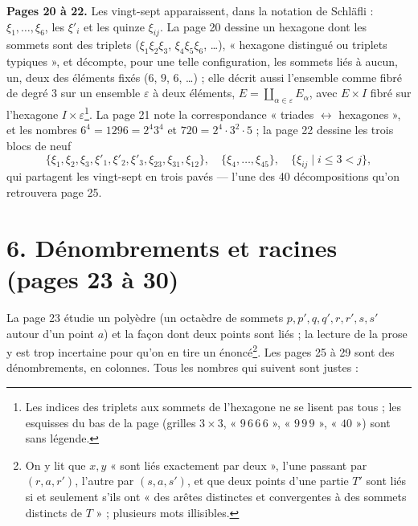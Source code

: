 \documentclass[11pt,a4paper]{article}
\begin{document}
\textbf{Pages 20 à 22.} Les vingt-sept apparaissent, dans la notation de
Schläfli : $\xi_1, \ldots, \xi_6$, les $\xi'_i$ et les quinze $\xi_{ij}$. La
page 20 dessine un hexagone dont les sommets sont des triplets ($\xi_1 \xi_2
\xi_3$, $\xi_4 \xi_5 \xi_6$, \ldots), « hexagone distingué ou triplets
typiques », et décompte, pour une telle configuration, les sommets liés à
aucun, un, deux des éléments fixés ($6$, $9$, $6$, \ldots) ; elle décrit aussi
l'ensemble comme fibré de degré 3 sur un ensemble $\varepsilon$ à deux
éléments, $E = \coprod_{\alpha \in \varepsilon} E_\alpha$, avec $E \times I$
fibré sur l'hexagone $I \times \varepsilon$\footnote{Les indices des triplets
aux sommets de l'hexagone ne se lisent pas tous ; les esquisses du bas de la
page (grilles $3 \times 3$, « $9\,6\,6\,6$ », « $9\,9\,9$ », « $40$ ») sont sans
légende.}. La page 21 note la correspondance « triades $\leftrightarrow$
hexagones », et les nombres $6^4 = 1296 = 2^4 3^4$ et $720 = 2^4 \cdot 3^2
\cdot 5$ ; la page 22 dessine les trois blocs de neuf
\[
\lbrace \xi_1, \xi_2, \xi_3, \xi'_1, \xi'_2, \xi'_3, \xi_{23}, \xi_{31},
\xi_{12}\rbrace, \quad \lbrace \xi_4, \ldots, \xi_{45}\rbrace, \quad \lbrace
\xi_{ij} \mid i \leq 3 < j\rbrace ,
\]
qui partagent les vingt-sept en trois pavés --- l'une des 40 décompositions
qu'on retrouvera page 25.

\section*{6. Dénombrements et racines (pages 23 à 30)}

La page 23 étudie un polyèdre (un octaèdre de sommets $p, p', q, q', r, r', s,
s'$ autour d'un point $a$) et la façon dont deux points sont liés ; la lecture
de la prose y est trop incertaine pour qu'on en tire un énoncé\footnote{On y
lit que $x, y$ « sont liés exactement par deux », l'une passant par $(r, a,
r')$, l'autre par $(s, a, s')$, et que deux points d'une partie $T'$ sont liés
si et seulement s'ils ont « des arêtes distinctes et convergentes à des sommets
distincts de $T$ » ; plusieurs mots illisibles.}. Les pages 25 à 29 sont des
dénombrements, en colonnes. Tous les nombres qui suivent sont justes :
\end{document}
